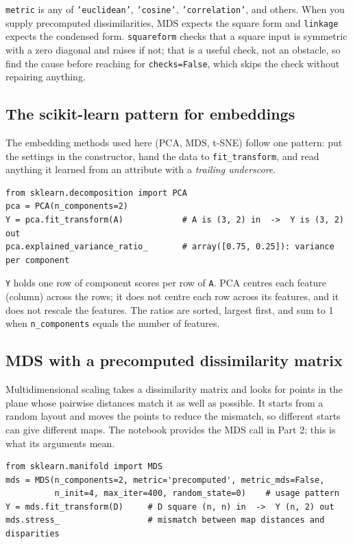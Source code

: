 \documentclass[11pt]{article}
\begin{document}
\texttt{metric} is any of \texttt{'euclidean'}, \texttt{'cosine'},
\texttt{'correlation'}, and others. When you supply precomputed dissimilarities, MDS
expects the square form and \texttt{linkage} expects the condensed form. \texttt{squareform}
checks that a square input is symmetric with a zero diagonal and raises if not; that is a
useful check, not an obstacle, so find the cause before reaching for
\texttt{checks=False}, which skips the check without repairing anything.

\subsection{The scikit-learn pattern for embeddings}

The embedding methods used here (PCA, MDS, t-SNE) follow one pattern: put the settings in
the constructor, hand the data to \texttt{fit\_transform}, and read anything it learned
from an attribute with a \emph{trailing underscore}.

\begin{codebox}
\begin{verbatim}
from sklearn.decomposition import PCA
pca = PCA(n_components=2)
Y = pca.fit_transform(A)            # A is (3, 2) in  ->  Y is (3, 2) out
pca.explained_variance_ratio_       # array([0.75, 0.25]): variance per component
\end{verbatim}
\end{codebox}

\texttt{Y} holds one row of component scores per row of \texttt{A}. PCA centres each
feature (column) across the rows; it does not centre each row across its features, and it
does not rescale the features. The ratios are sorted, largest first, and sum to 1 when
\texttt{n\_components} equals the number of features.

\subsection{MDS with a precomputed dissimilarity matrix}

Multidimensional scaling takes a dissimilarity matrix and looks for points in the plane
whose pairwise distances match it as well as possible. It starts from a random layout and
moves the points to reduce the mismatch, so different starts can give different maps. The
notebook provides the MDS call in Part 2; this is what its arguments mean.

\begin{codebox}
\begin{verbatim}
from sklearn.manifold import MDS
mds = MDS(n_components=2, metric='precomputed', metric_mds=False,
          n_init=4, max_iter=400, random_state=0)    # usage pattern
Y = mds.fit_transform(D)     # D square (n, n) in  ->  Y (n, 2) out
mds.stress_                  # mismatch between map distances and disparities
\end{verbatim}
\end{codebox}
\end{document}
